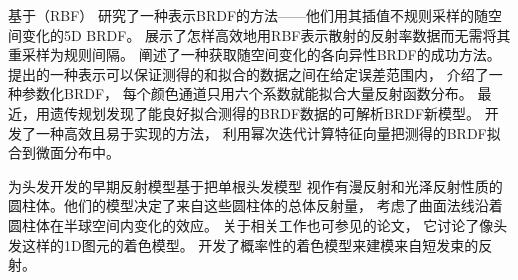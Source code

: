 \citet{10.5555/2383654.2383690}基于（RBF）
研究了一种表示BRDF的方法——他们用其插值不规则采样的随空间变化的5D BRDF。
\citet{weistroffer2007efficient}展示了怎样高效地用RBF表示散射的反射率数据而无需将其重采样为规则间隔。
\citet{10.1145/1399504.1360640}阐述了一种获取随空间变化的各向异性BRDF的成功方法。
\citet{6165276}提出的一种表示可以保证测得的和拟合的数据之间在给定误差范围内，
\citet{10.1111/j.1467-8659.2012.03147.x}介绍了一种参数化BRDF，
每个颜色通道只用六个系数就能拟合大量反射函数分布。
最近，\citet{10.1145/2601097.2601193}用遗传规划发现了能良好拟合测得的BRDF数据的可解析BRDF新模型。
\citet{10.1111/cgf.12675}开发了一种高效且易于实现的方法，
利用幂次迭代计算特征向量把测得的BRDF拟合到微面分布中。

\citet{10.1145/74333.74361}为头发开发的早期反射模型基于把单根头发模型
视作有漫反射和光泽反射性质的圆柱体。他们的模型决定了来自这些圆柱体的总体反射量，
考虑了曲面法线沿着圆柱体在半球空间内变化的效应。
关于相关工作也可参见\citet{10.1145/192161.192246}的论文，
它讨论了像头发这样的1D图元的着色模型。
\citet{10.1145/258734.258807}开发了概率性的着色模型来建模来自短发束的反射。
